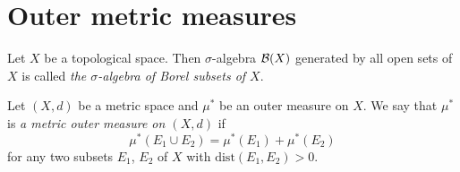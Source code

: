 \section{Outer metric measures}

\begin{definition}
Let $X$ be a topological space. Then $\sigma$-algebra ${\mathcal B}(X)$ generated by all open sets of $X$ is called \textit{the $\sigma$-algebra of Borel subsets of $X$}.
\end{definition}

\begin{definition}
Let $(X,d)$ be a metric space and $\mu^*$ be an outer measure on $X$. We say that $\mu^*$ is \textit{a metric outer measure on $(X,d)$} if  
$$\mu^*(E_1\cup E_2)=\mu^*(E_1)+\mu^*(E_2)$$
for any two subsets $E_1$, $E_2$ of $X$ with $\mathrm{dist}(E_1,E_2) > 0$.
\end{definition}

